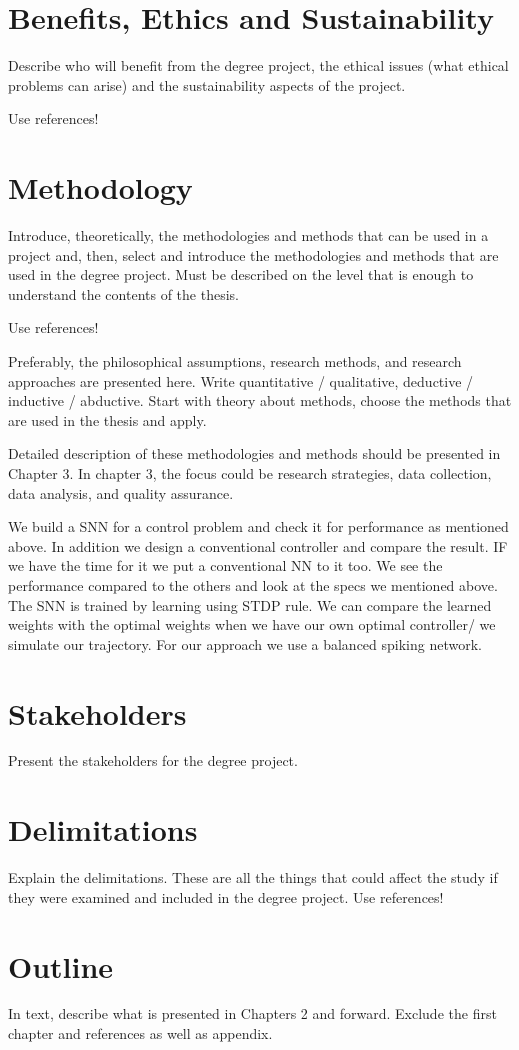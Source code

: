 \section{Benefits, Ethics and Sustainability}
Describe who will benefit from the degree project, the ethical issues (what ethical problems can arise) and the sustainability aspects of the project.

Use references!

\section{Methodology}
Introduce, theoretically, the methodologies and methods that can be used in a project and, then, select and introduce the methodologies and methods that are used in the degree project. Must be described on the level that is enough to understand the contents of the thesis.

Use references!

Preferably, the philosophical assumptions, research methods, and research approaches are presented here. Write quantitative / qualitative, deductive / inductive / abductive. Start with theory about methods, choose the methods that are used in the thesis and apply.


Detailed description of these methodologies and methods should be presented in Chapter 3. In chapter 3, the focus could be research strategies, data collection, data analysis, and quality assurance.


We build a SNN for a control problem and check it for performance as mentioned above. In addition we design a conventional controller and compare the result. IF we have the time for it we put a conventional NN to it too. We see the performance compared to the others and look at the specs we mentioned above.
The SNN is trained by learning using STDP rule. We can compare the learned weights with the optimal weights when we have our own optimal controller/ we simulate our trajectory.
For our approach we use a balanced spiking network.
\section{Stakeholders}
Present the stakeholders for the degree project.

\section{Delimitations}
Explain the delimitations. These are all the things that could affect the study if they were examined and included in the degree project.
Use references!

\section{Outline}
In text, describe what is presented in Chapters 2 and forward. Exclude the first chapter and references as well as appendix.
